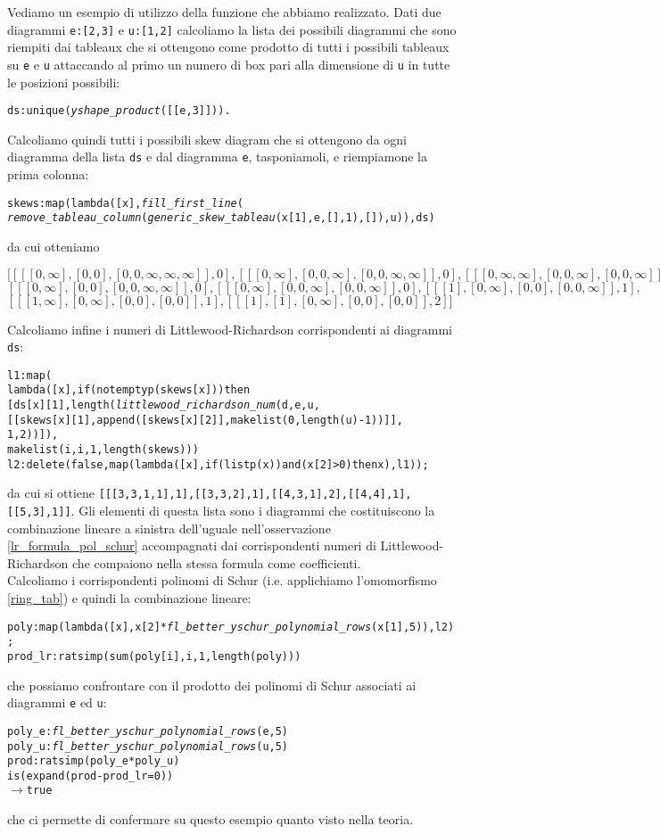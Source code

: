 Vediamo un esempio di utilizzo della funzione che abbiamo realizzato.
Dati due diagrammi \texttt{e:[2,3]} e \texttt{u:[1,2]} calcoliamo la
lista dei possibili diagrammi che sono riempiti dai tableaux che si
ottengono come prodotto di tutti i possibili tableaux su \texttt{e} e
\texttt{u} attaccando al primo un numero di box pari alla dimensione
di \texttt{u} in tutte le posizioni possibili:
\begin{alltt}
ds:unique (\emph{yshape\_product} ([[e,3]])).
\end{alltt}
Calcoliamo quindi tutti i possibili skew diagram che si ottengono da ogni
diagramma della lista \texttt{ds} e dal diagramma \texttt{e},
tasponiamoli, e riempiamone la prima colonna:
\begin{alltt}
skews:map (lambda ([x], \emph{fill\_first\_line} (
  \emph{remove\_tableau\_column} (\emph{generic\_skew\_tableau} (x[1], e, [], 1),[]), u)), ds)
\end{alltt}
da cui otteniamo
\begin{alltt}
\([[[[0,\infty],[0,0],[0,0,\infty,\infty,\infty]],0],[[[0,\infty],[0,0,\infty],[0,0,\infty,\infty]],0],[[[0,\infty,\infty],[0,0,\infty],[0,0,\infty]],0],\)
\([[[0,\infty],[0,0],[0,0,\infty,\infty]],0],[[[0,\infty],[0,0,\infty],[0,0,\infty]],0],[[[1],[0,\infty],[0,0],[0,0,\infty]],1],\)
\([[[1,\infty],[0,\infty],[0,0],[0,0]],1],[[[1],[1],[0,\infty],[0,0],[0,0]],2]]\)
\end{alltt}

Calcoliamo infine i numeri di Littlewood-Richardson corrispondenti ai
diagrammi \texttt{ds}:
\begin{alltt}
l1:map (
    lambda ([x], if (not emptyp (skews[x])) then 
      [ds[x][1],length(\emph{littlewood\_richardson\_num}(d,e,u,
                      [[skews[x][1],append([skews[x][2]],makelist(0,length(u)-1))]],
                      1,2))]),
    makelist (i,i,1,length (skews)))
l2 : delete (false, map (lambda ([x], if (listp (x)) and (x[2] > 0) then x ), l1));
\end{alltt}
da cui si ottiene
\texttt{[[[3,3,1,1],1],[[3,3,2],1],[[4,3,1],2],[[4,4],1],[[5,3],1]]}.
Gli elementi di questa lista sono i diagrammi che costituiscono la combinazione lineare a sinistra
dell'uguale nell'osservazione \ref{lr_formula_pol_schur} accompagnati
dai corrispondenti numeri di Littlewood-Richardson che compaiono nella
stessa formula come coefficienti.\\
Calcoliamo i corrispondenti polinomi di Schur (i.e. applichiamo
l'omomorfismo \eqref{ring_tab}) e quindi la combinazione lineare:
\begin{alltt}
poly:map (lambda ([x], x[2]*\emph{fl\_better\_yschur\_polynomial\_rows} (x[1],5)), l2);
prod\_lr:ratsimp (sum (poly[i],i,1,length(poly)))
\end{alltt}
che possiamo confrontare con il prodotto dei polinomi di Schur
associati ai diagrammi \texttt{e} ed \texttt{u}:
\begin{alltt}
poly\_e:\emph{fl\_better\_yschur\_polynomial\_rows} (e,5)
poly\_u:\emph{fl\_better\_yschur\_polynomial\_rows} (u,5)
prod:ratsimp (poly\_e*poly\_u)
is (expand (prod - prod\_lr = 0))
\(\rightarrow\) true
\end{alltt}
che ci permette di confermare su questo esempio quanto visto nella teoria.
